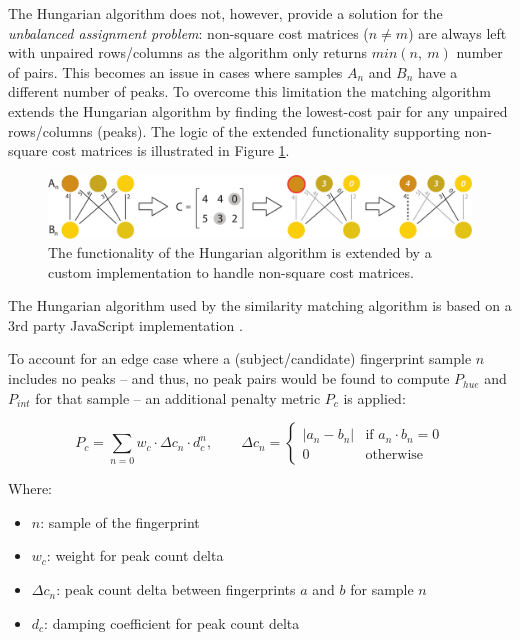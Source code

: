 \documentclass[thesis.tex]{subfiles}
\begin{document}
The Hungarian algorithm does not, however, provide a solution for the \emph{unbalanced assignment problem}: non-square cost matrices ($n \neq m$) are always left with unpaired rows/columns as the algorithm only returns $min (n,\ m)$ number of pairs. This becomes an issue in cases where samples $A_n$ and $B_n$ have a different number of peaks. To overcome this limitation the matching algorithm extends the Hungarian algorithm by finding the lowest-cost pair for any unpaired rows/columns (peaks). The logic of the extended functionality supporting non-square cost matrices is illustrated in Figure \ref{figure:hungarian-algorithm-extended}.

\begin{figure}[h]
\centering \includegraphics[width=\textwidth,height=\textheight,keepaspectratio=true]{images/design_implementation/hungarian_algorithm_ext}
\caption{The functionality of the Hungarian algorithm is extended by a custom implementation to handle non-square cost matrices.\label{figure:hungarian-algorithm-extended}}
\end{figure}

\noindent The Hungarian algorithm used by the similarity matching algorithm is based on a 3rd party JavaScript implementation \cite{munkres-js}.

To account for an edge case where a (subject/candidate) fingerprint sample $n$ includes no peaks -- and thus, no peak pairs would be found to compute $P_{hue}$ and $P_{int}$ for that sample -- an additional penalty metric $P_c$ is applied:

\begin{equation}
\label{equation:similarity-metric-no-peaks}
P_c = \sum \limits_{n=0} { w_c \cdot \Delta{c_n} \cdot d_c^n }, \qquad
\Delta{c_n} = \begin{cases}
|a_n - b_n| &\text{if $a_n \cdot b_n = 0$}\\
0 &\text{otherwise}
\end{cases}
\end{equation}

Where:
\begin{itemize}[label=]
	\setlength\itemsep{0.10em}
    \item $n$: sample of the fingerprint
    \item $w_c$: weight for peak count delta
    \item $\Delta{c_n}$: peak count delta between fingerprints $a$ and $b$ for sample $n$
    \item $d_c$: damping coefficient for peak count delta
\end{itemize}
\end{document}
